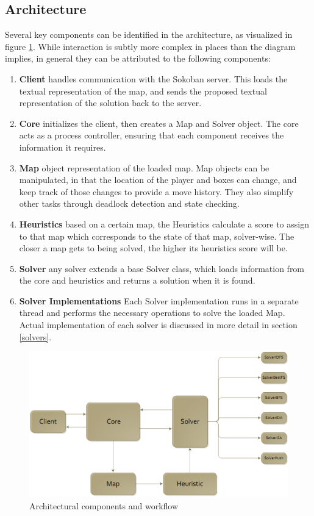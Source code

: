 \subsection{Architecture}
Several key components can be identified in the architecture, as visualized in figure \ref{fig:architecture}. While interaction is subtly more complex in places than the diagram implies, in general they can be attributed to the following components:
\begin{enumerate}
	\item \textbf{Client} handles communication with the Sokoban server. This loads the textual representation of the map, and sends the proposed textual representation of the solution back to the server.
	\item \textbf{Core} initializes the client, then creates a Map and Solver object. The core acts as a process controller, ensuring that each component receives the information it requires.
	\item \textbf{Map} object representation of the loaded map. Map objects can be manipulated, in that the location of the player and boxes can change, and keep track of those changes to provide a move history. They also simplify other tasks through deadlock detection and state checking.
	\item \textbf{Heuristics} based on a certain map, the Heuristics calculate a score to assign to that map which corresponds to the state of that map, solver-wise. The closer a map gets to being solved, the higher its heuristics score will be.
	\item \textbf{Solver} any solver extends a base Solver class, which loads information from the core and heuristics and returns a solution when it is found.
	\item \textbf{Solver Implementations} Each Solver implementation runs in a separate thread and performs the necessary operations to solve the loaded Map. Actual implementation of each solver is discussed in more detail in section \ref{solvers}.
\end{enumerate}

\begin{figure}
\includegraphics[width=2.1\columnwidth]{./images/architecture.png}
\caption{ Architectural components and workflow}
\label{fig:architecture}
\end{figure}




